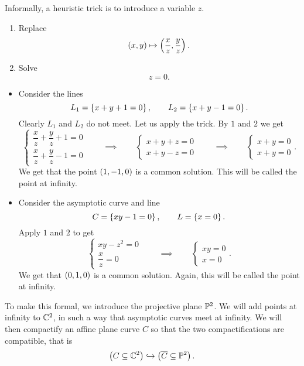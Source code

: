 Informally, a heuristic trick is to introduce a variable $ z $.
\begin{enumerate}
\item Replace
$$ \rb{x, y} \mapsto \rb{\dfrac{x}{z}, \dfrac{y}{z}}. $$
\item Solve
$$ z = 0. $$
\end{enumerate}

\begin{example}
\hfill
\begin{itemize}
\item Consider the lines
$$ L_1 = \cb{x + y + 1 = 0}, \qquad L_2 = \cb{x + y - 1 = 0}. $$
Clearly $ L_1 $ and $ L_2 $ do not meet. Let us apply the trick. By $ 1 $ and $ 2 $ we get
$$
\begin{cases}
\dfrac{x}{z} + \dfrac{y}{z} + 1 = 0 \\
\dfrac{x}{z} + \dfrac{y}{z} - 1 = 0
\end{cases}
\qquad \implies \qquad
\begin{cases}
x + y + z = 0 \\
x + y - z = 0
\end{cases}
\qquad \implies \qquad
\begin{cases}
x + y = 0 \\
x + y = 0
\end{cases}.
$$
We get that the point $ \rb{1, -1, 0} $ is a common solution. This will be called the point at infinity.
\item Consider the asymptotic curve and line
$$ C = \cb{xy - 1 = 0}, \qquad L = \cb{x = 0}. $$
Apply $ 1 $ and $ 2 $ to get
$$
\begin{cases}
xy - z^2 = 0 \\
\dfrac{x}{z} = 0
\end{cases}
\qquad \implies \qquad
\begin{cases}
xy = 0 \\
x = 0
\end{cases}.
$$
We get that $ \rb{0, 1, 0} $ is a common solution. Again, this will be called the point at infinity.
\end{itemize}
\end{example}

To make this formal, we introduce the projective plane $ \P^2 $. We will add points at infinity to $ \C^2 $, in such a way that asymptotic curves meet at infinity. We will then compactify an affine plane curve $ C $ so that the two compactifications are compatible, that is
$$ \rb{C \subseteq \C^2} \hookrightarrow \rb{\overline{C} \subseteq \P^2}. $$

